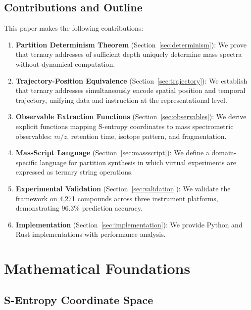 \documentclass[twocolumn,10pt]{article}
\begin{document}
\subsection{Contributions and Outline}

This paper makes the following contributions:

\begin{enumerate}[leftmargin=*]
\item \textbf{Partition Determinism Theorem} (Section~\ref{sec:determinism}): We prove that ternary addresses of sufficient depth uniquely determine mass spectra without dynamical computation.

\item \textbf{Trajectory-Position Equivalence} (Section~\ref{sec:trajectory}): We establish that ternary addresses simultaneously encode spatial position and temporal trajectory, unifying data and instruction at the representational level.

\item \textbf{Observable Extraction Functions} (Section~\ref{sec:observables}): We derive explicit functions mapping S-entropy coordinates to mass spectrometric observables: $m/z$, retention time, isotope pattern, and fragmentation.

\item \textbf{MassScript Language} (Section~\ref{sec:massscript}): We define a domain-specific language for partition synthesis in which virtual experiments are expressed as ternary string operations.

\item \textbf{Experimental Validation} (Section~\ref{sec:validation}): We validate the framework on 4,271 compounds across three instrument platforms, demonstrating 96.3\% prediction accuracy.

\item \textbf{Implementation} (Section~\ref{sec:implementation}): We provide Python and Rust implementations with performance analysis.
\end{enumerate}

\section{Mathematical Foundations}

\subsection{S-Entropy Coordinate Space}
\end{document}
